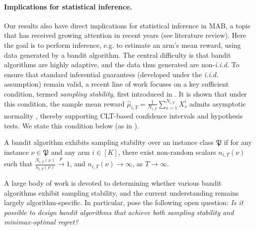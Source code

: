 \documentclass[nonblindrev]{informs3_noinforms}
\begin{document}
\paragraph{Implications for statistical inference.} 
Our results also have direct implications for statistical inference in MAB, a topic that has received growing attention in recent years (see literature review). Here the goal is to perform inference, e.g. to estimate an arm's mean reward, using data generated by a bandit algorithm. The central difficulty is that bandit algorithms are highly adaptive, and the data thus generated are non-\emph{i.i.d.} To ensure that standard inferential guarantees (developed under the \emph{i.i.d.} assumption) remain valid, a recent line of work \citep{han2024ucb,khamaru2024inference,praharaj2025instability} focuses on a key sufficient condition, termed \emph{sampling stability}, first introduced in \citet{lai1982least}. It is shown that under this condition, the sample mean reward $\hat\mu_{i,T} = \frac{1}{N_{i,T}}\sum_{s=1}^{N_{i,T}} X^i_s$ admits asymptotic normality \citep{han2024ucb}, thereby supporting CLT-based confidence intervals and hypothesis tests. We state this condition below (as in \citealp{praharaj2025instability}).
\begin{definition}\label{def:sampling-stability}
A bandit algorithm exhibits sampling stability over an instance class $\mathfrak{P}$ if for any instance $\nu\in\mathfrak{P}$ and any arm $i\in[K]$, there exist non-random scalars $n_{i,T}(\nu)$ such that $\frac{N_{i,T}(\nu)}{n_{i,T}(\nu)}\xrightarrow{p}1$, and $n_{i,T}(\nu)\to\infty$, as $T\to\infty.$
\end{definition}
A large body of work is devoted to determining whether various bandit algorithms exhibit sampling stability, and the current understanding remains largely algorithm-specific. In particular, \citet{praharaj2025instability} pose the following open question: \emph{Is it possible to design bandit algorithms that achieve both sampling stability and minimax-optimal regret?}
\end{document}
